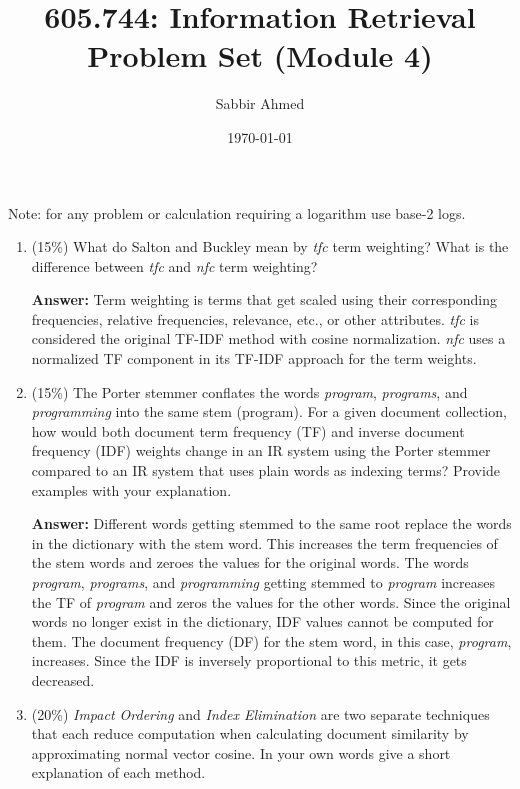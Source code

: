 \documentclass[11pt]{article}
\title{605.744: Information Retrieval \\ Problem Set (Module 4)}
\author{Sabbir Ahmed}
\date{\today}
\begin{document}
\maketitle

    Note: for any problem or calculation requiring a logarithm use base-2 logs.
    \begin{enumerate}

        \item (15\%) What do Salton and Buckley mean by \textit{tfc} term weighting? What is the difference between \textit{tfc} and \textit{nfc} term weighting?
        
        \textbf{Answer:} Term weighting is terms that get scaled using their corresponding frequencies, relative frequencies, relevance, etc., or other attributes. \textit{tfc} is considered the original TF-IDF method with cosine normalization. \textit{nfc} uses a normalized TF component in its TF-IDF approach for the term weights.

        \item (15\%) The Porter stemmer conflates the words \textit{program}, \textit{programs}, and \textit{programming} into the same stem (program). For a given document collection, how would both document term frequency (TF) and inverse document frequency (IDF) weights change in an IR system using the Porter stemmer compared to an IR system that uses plain words as indexing terms? Provide examples with your explanation.

        \textbf{Answer:} Different words getting stemmed to the same root replace the words in the dictionary with the stem word. This increases the term frequencies of the stem words and zeroes the values for the original words. The words \textit{program}, \textit{programs}, and \textit{programming} getting stemmed to \textit{program} increases the TF of \textit{program} and zeros the values for the other words. Since the original words no longer exist in the dictionary, IDF values cannot be computed for them. The document frequency (DF) for the stem word, in this case, \textit{program}, increases. Since the IDF is inversely proportional to this metric, it gets decreased.

        \item (20\%) \textit{Impact Ordering} and \textit{Index Elimination} are two separate techniques that each reduce computation when calculating document similarity by approximating normal vector cosine. In your own words give a short explanation of each method.


\end{enumerate}
\end{document}
